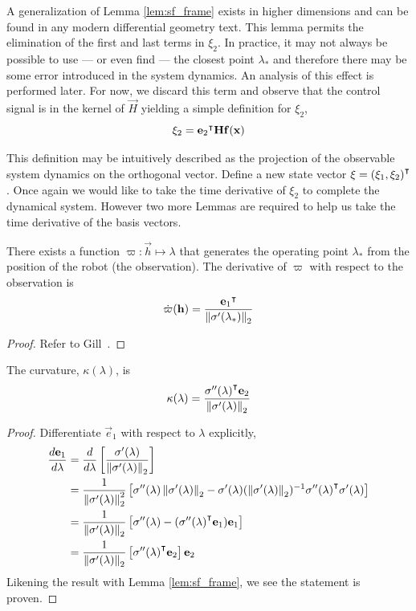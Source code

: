 \documentclass[oneside, 11pt]{book}
\begin{document}
A generalization of Lemma \ref{lem:sf_frame} exists in higher dimensions and can be found in any modern differential geometry text\cite{Kuhnel06}. This lemma permits the elimination of the first and last terms in $\xi_2$. In practice, it may not always be possible to use --- or even find --- the closest point $\lambda_*$ and therefore there may be some error introduced in the system dynamics. An analysis of this effect is performed later. For now, we discard this term and observe that the control signal is in the kernel of $\vec{H}$ yielding a simple definition for $\xi_2$,
$$\xi_2 = {\mathbf{e}_2}^{\intercal}\mathbf{H}\mathbf{f}(\mathbf{x})$$

This definition may be intuitively described as the projection of the observable system dynamics on the orthogonal vector. Define a new state vector $\mathbf{\xi}={(\xi_1, \xi_2)}^{\intercal}$. Once again we would like to take the time derivative of $\xi_2$ to complete the dynamical system. However two more Lemmas are required to help us take the time derivative of the basis vectors.
\begin{lemma}
    There exists a function $\varpi:\vec{h}\mapsto\lambda$ that generates the operating point $\lambda_*$ from the position of the robot (the observation). The derivative of $\varpi$ with respect to the observation is
    $$\dot{\varpi}(\mathbf{h}) = \frac{{\mathbf{e}_1}^{\intercal}}{\left\|\sigma'(\lambda_*)\right\|_2}$$
\end{lemma}
\begin{proof}
    Refer to Gill~\cite{Gill15}.
\end{proof}
\begin{lemma}
    The curvature, $\kappa(\lambda)$, is
    $$
        \kappa(\lambda) = \frac{{\sigma''(\lambda)}^{\intercal}\mathbf{e}_2}{\left\|\sigma'(\lambda)\right\|_2}
    $$
    \label{lem:kappa}
\end{lemma}
\begin{proof}
    Differentiate $\vec{e}_1$ with respect to $\lambda$ explicitly,
    \begin{align*}
        \frac{d\mathbf{e}_1}{d\lambda} &=  \frac{d}{d\lambda}\left[ \frac{\sigma'(\lambda)}{\left\|\sigma'(\lambda)\right\|_2}\right]\\
                                    &=  \frac{1}{\left\|\sigma'(\lambda)\right\|_2^2}\left[\sigma''(\lambda)\left\|\sigma'(\lambda)\right\|_2-\sigma'(\lambda)(\left\|\sigma'(\lambda)\right\|_2)^{-1}{\sigma''(\lambda)}^{\intercal}\sigma'(\lambda)\right]\\
                                    &=  \frac{1}{\left\|\sigma'(\lambda)\right\|_2}\left[\sigma''(\lambda)-({\sigma''(\lambda)}^{\intercal}\mathbf{e}_1)\mathbf{e}_1 \right]\\
                                    &=  \frac{1}{\left\|\sigma'(\lambda)\right\|_2}\left[{\sigma''(\lambda)}^{\intercal}\mathbf{e}_2\right]\mathbf{e}_2
    \end{align*}
    Likening the result with Lemma \ref{lem:sf_frame}, we see the statement is proven.
\end{proof}
\end{document}
